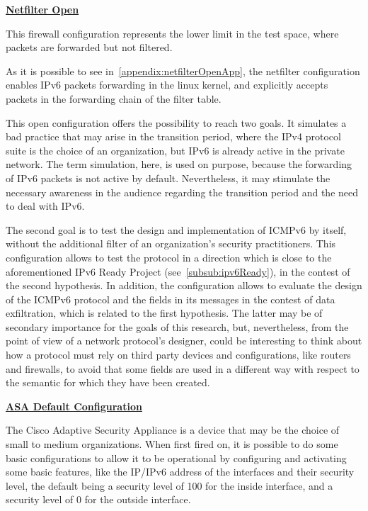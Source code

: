 \documentclass[12pt]{article}
\begin{document}
\textbf{\underline{Netfilter Open}}
\label{subsub:netfilterOpen}

This firewall configuration represents the lower limit in the test space, where packets are forwarded but not filtered.

As it is possible to see in~\ref{appendix:netfilterOpenApp}, the netfilter configuration enables IPv6 packets forwarding in the linux kernel, and explicitly accepts packets in the forwarding chain of the filter table.

This open configuration offers the possibility to reach two goals. It simulates a bad practice that may arise in the transition period, where the IPv4 protocol suite is the choice of an organization, but IPv6 is already active in the private network. The term simulation, here, is used on purpose, because the forwarding of IPv6 packets is not active by default. Nevertheless, it may stimulate the necessary awareness in the audience regarding the transition period and the need to deal with IPv6.

The second goal is to test the design and implementation of ICMPv6 by itself, without the additional filter of an organization's security practitioners. This configuration allows to test the protocol in a direction which is close to the aforementioned IPv6 Ready Project (see~\ref{subsub:ipv6Ready}), in the contest of the second hypothesis. In addition, the configuration allows to evaluate the design of the ICMPv6 protocol and the fields in its messages in the contest of data exfiltration, which is related to the first hypothesis. The latter may be of secondary importance for the goals of this research, but, nevertheless, from the point of view of a network protocol's designer, could be interesting to think about how a protocol must rely on third party devices and configurations, like routers and firewalls, to avoid that some fields are used in a different way with respect to the semantic for which they have been created.

\textbf{\underline{ASA Default Configuration}}
\label{subsub:asaDefault}

The Cisco Adaptive Security Appliance is a device that may be the choice of small to medium organizations. When first fired on, it is possible to do some basic configurations to allow it to be operational by configuring and activating some basic features, like the IP/IPv6 address of the interfaces and their security level, the default being a security level of 100 for the inside interface, and a security level of 0 for the outside interface.
\end{document}
